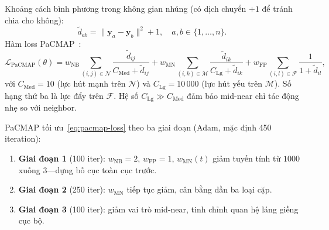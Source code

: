 Khoảng cách bình phương trong không gian nhúng (có dịch chuyển $+1$ để tránh chia cho không):
\begin{equation}
  \tilde{d}_{ab} = \|\mathbf{y}_a - \mathbf{y}_b\|^2 + 1, \quad a,b \in \{1,\ldots,n\}.
  \label{eq:pacmap-dist}
\end{equation}
Hàm loss PaCMAP~\cite{wang2021pacmap}:
\begin{equation}
  \mathcal{L}_{\text{PaCMAP}}(\theta)
  = w_{\text{NB}} \!\!\sum_{(i,j)\in\mathcal{N}} \frac{\tilde{d}_{ij}}{C_{\text{Med}} + \tilde{d}_{ij}}
  + w_{\text{MN}} \!\!\sum_{(i,k)\in\mathcal{M}} \frac{\tilde{d}_{ik}}{C_{\text{Lg}} + \tilde{d}_{ik}}
  + w_{\text{FP}} \!\!\sum_{(i,l)\in\mathcal{F}} \frac{1}{1 + \tilde{d}_{il}},
  \label{eq:pacmap-loss}
\end{equation}
với $C_{\text{Med}} = 10$ (lực hút mạnh trên $\mathcal{N}$) và $C_{\text{Lg}} = 10\,000$ (lực hút yếu trên $\mathcal{M}$). Số hạng thứ ba là lực đẩy trên $\mathcal{F}$. Hệ số $C_{\text{Lg}} \gg C_{\text{Med}}$ đảm bảo mid-near chỉ tác động nhẹ so với neighbor.

PaCMAP tối ưu~\eqref{eq:pacmap-loss} theo ba giai đoạn (Adam, mặc định 450 iteration):
\begin{enumerate}
  \item \textbf{Giai đoạn 1} (100 iter): $w_{\text{NB}} = 2$, $w_{\text{FP}} = 1$, $w_{\text{MN}}(t)$ giảm tuyến tính từ $1000$ xuống $3$---dựng bố cục toàn cục trước.
  \item \textbf{Giai đoạn 2} (250 iter): $w_{\text{MN}}$ tiếp tục giảm, cân bằng dần ba loại cặp.
  \item \textbf{Giai đoạn 3} (100 iter): giảm vai trò mid-near, tinh chỉnh quan hệ láng giềng cục bộ.
\end{enumerate}

\begin{center}
\end{center}

